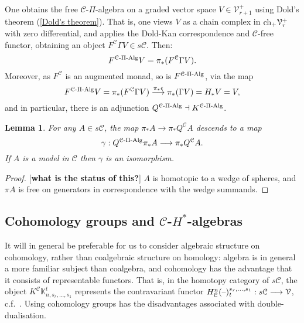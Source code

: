 \documentclass[11pt]{amsart}
\theoremstyle{plain}
\newtheorem{lem}[thm]{Lemma}
\theoremstyle{definition}
\newcommand{\DASH}{\textup{--}}
\renewcommand{\to}{\longrightarrow}
\newcommand{\calV}{\mathcal{V}}
\newcommand{\calc}{\mathcal{C}}
\theoremstyle{plain}
\newcommand{\vect}[2]{\calV^{#1}_{#2}}
\newcommand{\PiAlg}{\textup{-$\Pi$-Alg}}
\newcommand{\complexes}{\textup{ch}_+}
\begin{document}
\begin{CPiAlgs and CHalgs}
One obtains the free $\calc$-$\Pi$-algebra on a graded vector space $V\in \vect{+}{r+1}$ using Dold's theorem (\ref{Dold's theorem}). That is, one views $V$ as a chain complex in $\complexes\vect{+}{r}$ with zero differential, and applies the Dold-Kan correspondence and $\calc$-free functor, obtaining an object $F^\calc\Gamma V\in s\calc$. Then:
\[F^{\calc\PiAlg}V=\pi_*(F^\calc\Gamma V).\]
Moreover, as $F^\calc $ is an augmented monad, so is $F^{\calc\PiAlg}$, via the map
\[F^{\calc\PiAlg}V=\pi_*(F^\calc\Gamma V)\overset{\pi_*\epsilon}{\to}\pi_*(\Gamma V)=H_*V=V,\]
and in particular, there is an adjunction $Q^{\calc\PiAlg}\dashv K^{\calc\PiAlg}$.
\begin{lem}
For any $A\in s\calc$, the map $\pi_*A\to \pi_*Q^\calc A$ descends to a map 
\[\gamma:Q^{\calc\PiAlg}\pi_* A\to \pi_* Q^{\calc}A.\]
If $A$ is a model in $\calc$ then $\gamma$ is an isomorphism.
\end{lem}
\begin{proof}{[\textbf{what is the status of this?}]} $A$ is homotopic to a wedge of spheres, and $\pi A$ is free on generators in correspondence with the wedge summands.
\end{proof}
\subsection{Cohomology groups and $\calc$-$H^*$-algebras}\label{cohomology and Halgs}
It will in general be preferable for us to consider algebraic structure on cohomology, rather than coalgebraic structure on homology: algebra is in general a more familiar subject than coalgebra, and cohomology has the advantage that it consists of representable functors. That is, in the homotopy category of $s\calc$, the object $K^\calc\mathbb{K}^t_{n,s_r,\ldots,s_1}$ represents the contravariant functor $H^n_{\calc}(\DASH)_t^{s_r,\ldots,s_1}:s\calc\to\vect{}{}$,  c.f.\ \cite[Proposition 4.3]{MR1089001}. Using cohomology groups has the disadvantages associated with double-dualisation.





\end{CPiAlgs and CHalgs}
\end{document}
